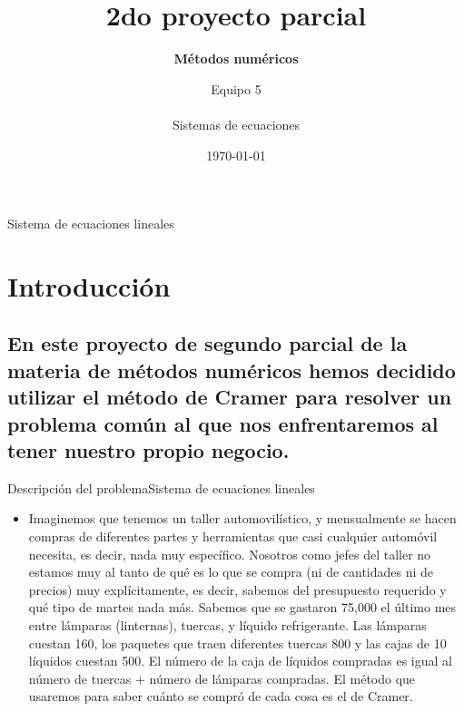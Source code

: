 \documentclass[10pt,xcolor={dvipsnames}]{beamer}
\title[] %
{ %
      \textbf{2do proyecto parcial}
}
\subtitle[2do proyecto parcial]
{
      \textbf{Métodos numéricos}
}
\author[Equipo 5]
{     Equipo 5 \\
      {\ttfamily }\\[1em]
     Sistemas de ecuaciones
}
\institute[]
{%
      Tecnológico de Monterrey
}
\date{\today}
\begin{document}

{\1%
\begin{frame}[plain,noframenumbering] %
  \titlepage %
\end{frame}}


\begin{frame}{Sistema de ecuaciones lineales}{}
\tableofcontents
\end{frame}

\section{Introducción}
\subsection{En este proyecto de segundo parcial de la materia de métodos numéricos hemos decidido utilizar el método de Cramer para resolver un problema común al que nos enfrentaremos al tener nuestro propio negocio.}
\begin{frame}{Descripción del problema}{Sistema de ecuaciones lineales}

  \begin{itemize}
    \item<1-> Imaginemos que tenemos un taller automovilístico, y mensualmente se hacen compras de diferentes partes y herramientas que casi cualquier automóvil necesita, es decir, nada muy específico. Nosotros como jefes del taller no estamos muy al tanto de qué es lo que se compra (ni de cantidades ni de precios) muy explícitamente, es decir, sabemos del presupuesto requerido y qué tipo de martes nada más. Sabemos que se gastaron 75,000 el último mes entre lámparas (linternas), tuercas, y líquido refrigerante. Las lámparas cuestan 160, los paquetes que traen diferentes tuercas 800 y las cajas de 10 líquidos cuestan 500. El número de la caja de líquidos compradas es igual al número de tuercas + número de lámparas compradas. El método que usaremos para saber cuánto se compró de cada cosa es el de Cramer.
   
  \end{itemize}
\end{frame}
\end{document}
